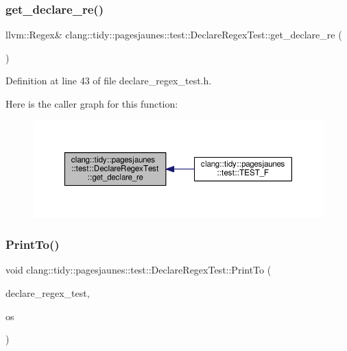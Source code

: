 \subsubsection{\texorpdfstring{get\+\_\+declare\+\_\+re()}{get\_declare\_re()}}
{\footnotesize\ttfamily llvm\+::\+Regex\& clang\+::tidy\+::pagesjaunes\+::test\+::\+Declare\+Regex\+Test\+::get\+\_\+declare\+\_\+re (\begin{DoxyParamCaption}{ }\end{DoxyParamCaption})\hspace{0.3cm}{\ttfamily [inline]}}



Definition at line 43 of file declare\+\_\+regex\+\_\+test.\+h.

Here is the caller graph for this function\+:
\nopagebreak
\begin{figure}[H]
\begin{center}
\leavevmode
\includegraphics[width=350pt]{classclang_1_1tidy_1_1pagesjaunes_1_1test_1_1_declare_regex_test_a515196a7c837ddce10b778b7097f500c_icgraph}
\end{center}
\end{figure}
\mbox{\label{classclang_1_1tidy_1_1pagesjaunes_1_1test_1_1_declare_regex_test_ae0118e9bf5e94c7fb448d1413df7f6e7}} 
\subsubsection{\texorpdfstring{Print\+To()}{PrintTo()}}
{\footnotesize\ttfamily void clang\+::tidy\+::pagesjaunes\+::test\+::\+Declare\+Regex\+Test\+::\+Print\+To (\begin{DoxyParamCaption}\item[{const \hyperlink{classclang_1_1tidy_1_1pagesjaunes_1_1test_1_1_declare_regex_test}{Declare\+Regex\+Test} \&}]{declare\+\_\+regex\+\_\+test,  }\item[{\+::std\+::ostream $\ast$}]{os }\end{DoxyParamCaption})}



